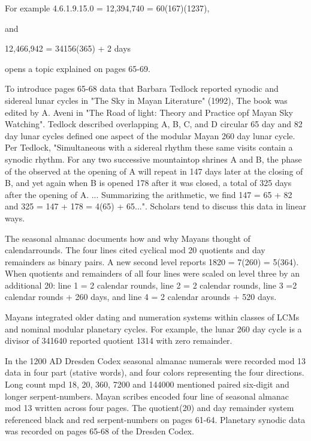 \documentclass[12pt]{article}
\begin{document}
For example 4.6.1.9.15.0 = 12,394,740 = 60(167)(1237), 

and 

12,466,942 = 34156(365) + 2 days

opens a topic explained on pages 65-69.

To introduce pages 65-68 data that Barbara Tedlock reported synodic and sidereal lunar cycles in "The Sky in Mayan Literature" (1992), The book was edited by A. Aveni in "The Road of light: Theory and Practice opf Mayan Sky Watching". Tedlock described overlapping A, B, C, and D circular 65 day and 82 day lunar cycles defined one aspect of the modular Mayan 260 day lunar cycle. Per Tedlock, "Simultaneous with a sidereal rhythm these same visits contain a synodic rhythm. For any two successive mountaintop shrines A and B, the phase of the observed at the opening of A will repeat in 147 days later at the closing of B, and yet again when B is opened 178 after it was closed, a total of 325 days after the opening of A. ... Summarizing the arithmetic, we find 147 = 65 + 82 and 325 = 147 + 178 = 4(65) + 65...". Scholars tend to discuss this data in linear ways. 

The seasonal almanac documents how and why Mayans thought of calendarrounds. The four lines cited cyclical mod 20 quotients and day remainders as binary pairs. A new second level reports 1820 = 7(260) = 5(364).  When quotients and remainders of all four lines were scaled on level three by an additional 20: line 1 = 2 calendar rounds, line 2 = 2 calendar rounds, line 3 =2 calendar rounds + 260 days, and line 4 = 2 calendar arounds + 520 days. 

Mayans integrated older   dating and numeration systems within classes of LCMs and nominal modular planetary cycles. For example, the lunar 260 day cycle is a divisor of 341640 reported quotient 1314 with zero remainder. 

In the 1200 AD Dresden Codex seasonal almanac numerals were recorded mod 13 data in four part (stative words), and four colors representing the four directions. Long count mpd 18, 20, 360, 7200 and 144000 mentioned paired six-digit and longer serpent-numbers. Mayan scribes encoded four line of seasonal almanac mod 13 written across four pages. The quotient(20) and day remainder system referenced black and red serpent-numbers on pages 61-64. Planetary synodic data was recorded on pages 65-68 of the Dresden Codex.
\end{document}
